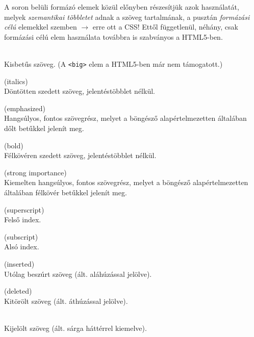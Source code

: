 \begin{frame}
  A soron belüli formázó elemek közül előnyben részesítjük azok használatát, melyek \emph{szemantikai többletet}
  adnak a szöveg tartalmának, a pusztán \emph{formázási célú} elemekkel szemben $\to$ erre ott a CSS!
  \vfill
  Ettől függetlenül, néhány, csak formázási célú elem használata továbbra is szabványos a HTML5-ben.
  \vfill
  \begin{description}[m]
    \item[\texttt{<small>}] \hfill \\ Kisbetűs szöveg. (A \texttt{<big>} elem a HTML5-ben már nem támogatott.)
    \item[\texttt{<i>}] (italics) \hfill \\ Döntötten szedett szöveg, jelentéstöbblet nélkül.
    \item[\texttt{<em>}] (emphasized) \hfill \\ Hangsúlyos, fontos szövegrész, melyet a böngésző alapértelmezetten általában dőlt betűkkel jelenít meg.
  \end{description}
\end{frame}

\begin{frame}
  \begin{description}[m]
    \small
    \item[\texttt{<b>}] (bold) \hfill \\ Félkövéren szedett szöveg, jelentéstöbblet nélkül.
    \item[\texttt{<strong>}] (strong importance) \hfill \\ Kiemelten hangsúlyos, fontos szövegrész, melyet a böngésző alapértelmezetten általában félkövér betűkkel jelenít meg.
    \item[\texttt{<sup>}] (superscript) \hfill \\ Felső index.
    \item[\texttt{<sub>}] (subscript) \hfill \\ Alsó index.
    \item[\texttt{<ins>}] (inserted) \hfill \\ Utólag beszúrt szöveg (ált. aláhúzással jelölve).
    \item[\texttt{<del>}] (deleted) \hfill \\ Kitörölt szöveg (ált. áthúzással jelölve).
    \item[\texttt{<mark>}] \hfill \\ Kijelölt szöveg (ált. sárga háttérrel kiemelve).
  \end{description}
\end{frame}

